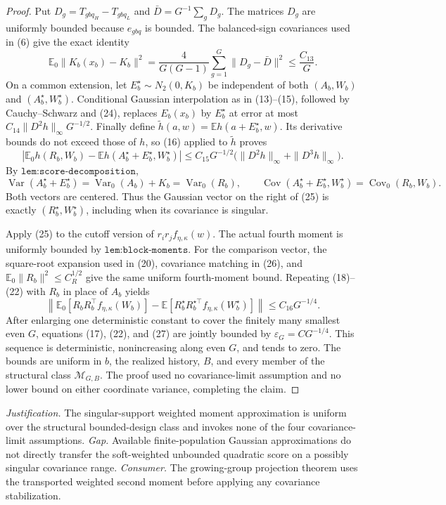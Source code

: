 \documentclass{article}
\begin{document}
\begin{proof}
Put \(D_g=T_{gbq_H}-T_{gbq_L}\) and \(\bar D=G^{-1}\sum_gD_g\).  The matrices \(D_g\) are uniformly bounded because \(e_{gbq}\) is bounded.  The balanced-sign covariances used in (6) give the exact identity
\[
 \mathbb E_0\|K_b(x_b)-K_b\|^2
 =\frac4{G(G-1)}\sum_{g=1}^G\|D_g-\bar D\|^2
 \leq \frac{C_{13}}G.                                                     \tag{24}
\]
On a common extension, let \(E_b^\star\sim N_2(0,K_b)\) be independent of both \((A_b,W_b)\) and \((A_b^\star,W_b^\star)\).  Conditional Gaussian interpolation as in (13)--(15), followed by Cauchy--Schwarz and (24), replaces \(E_b(x_b)\) by \(E_b^\star\) at error at most \(C_{14}\|D^2h\|_\infty G^{-1/2}\).  Finally define
\(
 \widetilde h(a,w)=\mathbb E h(a+E_b^\star,w)
\).  Its derivative bounds do not exceed those of \(h\), so (16) applied to \(\widetilde h\) proves
\[
 \left|\mathbb E_0h(R_b,W_b)
       -\mathbb Eh(A_b^\star+E_b^\star,W_b^\star)\right|
 \leq C_{15}G^{-1/2}
       \bigl(\|D^2h\|_\infty+\|D^3h\|_\infty\bigr).                   \tag{25}
\]
By \(\texttt{lem:score-decomposition}\),
\[
 \operatorname{Var}(A_b^\star+E_b^\star)
 =\operatorname{Var}_0(A_b)+K_b=\operatorname{Var}_0(R_b),
 \qquad
 \operatorname{Cov}(A_b^\star+E_b^\star,W_b^\star)
 =\operatorname{Cov}_0(R_b,W_b).                                         \tag{26}
\]
Both vectors are centered.  Thus the Gaussian vector on the right of (25) is exactly \((R_b^\star,W_b^\star)\), including when its covariance is singular.

Apply (25) to the cutoff version of \(r_ir_jf_{\eta,\kappa}(w)\).  The actual fourth moment is uniformly bounded by \(\texttt{lem:block-moments}\).  For the comparison vector, the square-root expansion used in (20), covariance matching in (26), and \(\mathbb E_0\|R_b\|^2\leq C_R^{1/2}\) give the same uniform fourth-moment bound.  Repeating (18)--(22) with \(R_b\) in place of \(A_b\) yields
\[
 \left\|\mathbb E_0[R_bR_b^\top f_{\eta,\kappa}(W_b)]
 -\mathbb E[R_b^\star R_b^{\star\top}f_{\eta,\kappa}(W_b^\star)]
 \right\|\leq C_{16}G^{-1/4}.                                           \tag{27}
\]
After enlarging one deterministic constant to cover the finitely many smallest even \(G\), equations (17), (22), and (27) are jointly bounded by
\(
 \varepsilon_G=C G^{-1/4}
\).  This sequence is deterministic, nonincreasing along even \(G\), and tends to zero.  The bounds are uniform in \(b\), the realized history, \(B\), and every member of the structural class \(\mathcal M_{G,B}\).  The proof used no covariance-limit assumption and no lower bound on either coordinate variance, completing the claim.
\end{proof}
\par\smallskip\noindent \textit{Justification.} The singular-support weighted moment approximation is uniform over the structural bounded-design class and invokes none of the four covariance-limit assumptions. \textit{Gap.} Available finite-population Gaussian approximations do not directly transfer the soft-weighted unbounded quadratic score on a possibly singular covariance range. \textit{Consumer.} The growing-group projection theorem uses the transported weighted second moment before applying any covariance stabilization.
\end{document}
